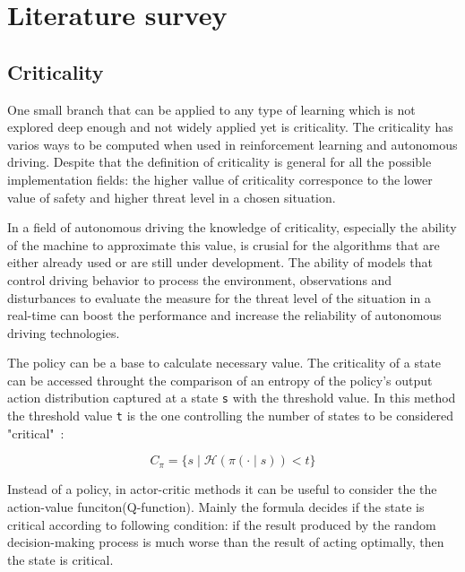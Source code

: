 \section{Literature survey}\label{chap:chap_2}

\subsection{Criticality}\label{sec:subsec_2.1}

One small branch that can be applied to any type of learning which is not explored deep enough and not widely applied yet is criticality. The criticality has varios ways to be computed when used in reinforcement learning and autonomous driving. Despite that the definition of criticality is general for all the possible implementation fields: the higher vallue of criticality corresponce to the lower value of safety and higher threat level\cite{CriticalityAutonomous2023} in a chosen situation. 

In a field of autonomous driving the knowledge of criticality, especially the ability of the machine to approximate this value, is crusial for the algorithms that are either already used or are still under development. The ability of models that control driving behavior to process the environment, observations and disturbances to evaluate the measure for the threat level of the situation in a real-time can boost the performance and increase the reliability of autonomous driving technologies. 

The policy can be a base to calculate necessary value. The criticality of a state can be accessed throught the comparison of an entropy of the policy's output action distribution captured at a state \texttt{s} with the threshold value. In this method the threshold value \texttt{t} is the one controlling the number of states to be considered "critical"~\cite{huang2018establishingappropriatetrustcritical}: 

\[ 
C_{\pi} = \{ s \mid \mathcal{H}(\pi(\cdot \mid s)) < t \}
\]


Instead of a policy, in actor-critic methods it can be useful to consider the the action-value funciton(Q-function). Mainly the formula decides if the state is critical according to following condition: if the result produced by the random decision-making process is much worse than the result of acting optimally, then the state is critical.

